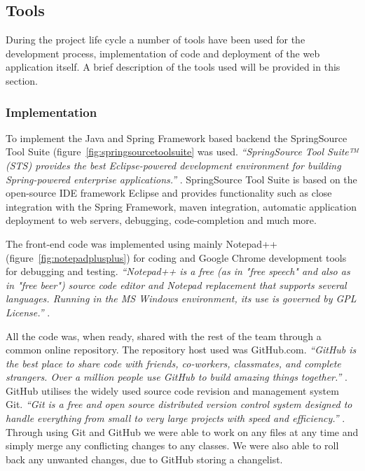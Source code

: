 \subsection{Tools}
During the project life cycle a number of tools have been used for the development process, implementation of code and deployment of the web application itself. A brief description of the tools used will be provided in this section.

\subsubsection{Implementation}
To implement the Java and Spring Framework based backend the SpringSource Tool Suite (figure~\ref{fig:springsourcetoolsuite} was used. \textit{``SpringSource Tool Suite™ (STS) provides the best Eclipse-powered development environment for building Spring-powered enterprise applications.''} \cite{SpringSource}. SpringSource Tool Suite is based on the open-source IDE framework Eclipse and provides functionality such as close integration with the Spring Framework, maven integration, automatic application deployment to web servers, debugging, code-completion and much more.

The front-end code was implemented using mainly Notepad++ (figure~\ref{fig:notepadplusplus}) for coding and Google Chrome development tools for debugging and testing. \textit{``Notepad++ is a free (as in "free speech" and also as in "free beer") source code editor and Notepad replacement that supports several languages. Running in the MS Windows environment, its use is governed by GPL License.''} \cite{Ho2012}.

All the code was, when ready, shared with the rest of the team through a common online repository. The repository host used was GitHub.com. \textit{``GitHub is the best place to share code with friends, co-workers, classmates, and complete strangers. Over a million people use GitHub to build amazing things together.''} \cite{GitHub}. GitHub utilises the widely used source code revision and management system Git. \textit{``Git is a free and open source distributed version control system designed to handle everything from small to very large projects with speed and efficiency.''} \cite{Git}. Through using Git and GitHub we were able to work on any files at any time and simply merge any conflicting changes to any classes. We were also able to roll back any unwanted changes, due to GitHub storing a changelist.


